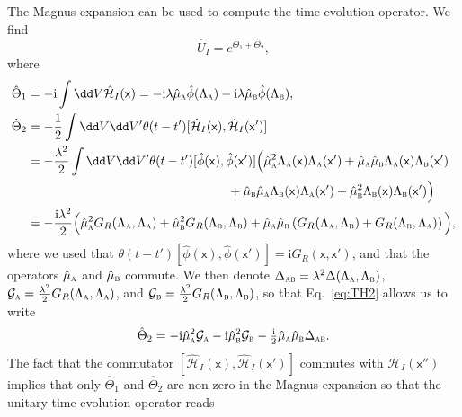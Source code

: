 \documentclass[letterpaper,12pt,titlepage,oneside,final]{book}
\newcommand{\mf}{\mathsf}%
\newcommand{\ii}{\mathrm{i}}
\newcommand{\tc}[1]{\textsc{#1}}
\begin{document}
The Magnus expansion can be used to compute the time evolution operator. We find
\begin{equation}
    \hat{U}_I = e^{\hat{\Theta}_1+\hat{\Theta}_2},
\end{equation}
where
\begin{align}
    \hat{\Theta}_1 &= - \ii \int \dd V \hat{\mathcal{H}}_I(\mf x) = - \ii \lambda \hat{\mu}_\tc{a} \hat{\phi}(\Lambda_\tc{a})- \ii \lambda \hat{\mu}_\tc{b} \hat{\phi}(\Lambda_\tc{b}),\label{eq:TH2}\\
    \hat{\Theta}_2 &= - \frac{1}{2} \int \dd V \dd V' \theta(t-t')[\hat{\mathcal{H}}_I(\mf x), \hat{\mathcal{H}}_I(\mf x')] \\&= - \frac{\lambda^2}{2}\int \dd V \dd V' \theta(t-t')[\hat{\phi}(\mf x), \hat{\phi}(\mf x')]\Big(\hat{\mu}_\tc{a}^2 \Lambda_\tc{a}(\mf x)\Lambda_\tc{a}(\mf x')+\hat{\mu}_\tc{a}\hat{\mu}_\tc{b} \Lambda_\tc{a}(\mf x)\Lambda_\tc{b}(\mf x')\nonumber\\
    &\:\:\:\:\:\:\:\:\:\:\:\:\:\:\:\:\:\:\:\:\:\:\:\:\:\:\:\:\:\:\:\:\:\:\:\:\:\:\:\:\:\:\:\:\:\:\:\:\:\:\:\:\:\:\:\:\:\:\:\:\:\:\:\:\:\:\:\:\:\:\:\:+\hat{\mu}_\tc{b}\hat{\mu}_\tc{a} \Lambda_\tc{b}(\mf x)\Lambda_\tc{a}(\mf x')+\hat{\mu}_\tc{b}^2 \Lambda_\tc{b}(\mf x)\Lambda_\tc{b}(\mf x')\Big)\nonumber\\
    &= - \frac{\ii \lambda^2}{2}\Big(\hat{\mu}_\tc{a}^2 G_R(\Lambda_\tc{a},\Lambda_\tc{a})+\hat{\mu}_\tc{b}^2 G_R(\Lambda_\tc{b},\Lambda_\tc{b})+\hat{\mu}_\tc{a}\hat{\mu}_\tc{b} \left(G_R(\Lambda_\tc{a},\Lambda_\tc{b})+ G_R(\Lambda_\tc{b},\Lambda_\tc{a})\right)\Big),\nonumber
\end{align}
where we used that $\theta(t-t')[\hat{\phi}(\mf x),\hat{\phi}(\mf x')] = \ii G_R(\mf x, \mf x')$, and that the operators $\hat{\mu}_\tc{a}$ and $\hat{\mu}_\tc{b}$ commute. We then denote $\Delta_\tc{ab} = \lambda^2\Delta(\Lambda_\tc{a},\Lambda_\tc{b})$, $\mathcal{G}_\tc{a} = \frac{\lambda^2}{2}G_R(\Lambda_\tc{a},\Lambda_\tc{a})$, and $\mathcal{G}_\tc{b} = \frac{\lambda^2}{2}G_R(\Lambda_\tc{b},\Lambda_\tc{b})$, so that Eq.~\eqref{eq:TH2} allows us to write
\begin{equation}
    \hat{\Theta}_2 = - \ii \hat{\mu}_\tc{a}^2\mathcal{G}_\tc{a}- \ii\hat{\mu}_\tc{b}^2 \mathcal{G}_\tc{b} -  \tfrac{\ii}{2}\hat{\mu}_\tc{a}\hat{\mu}_\tc{b}\Delta_\tc{ab}.
\end{equation}
The fact that the commutator $[\hat{\mathcal{H}}_I(\mf x), \hat{\mathcal{H}}_I(\mf x')]$ commutes with $\mathcal{H}_I(\mf x'')$ implies that only $\hat{\Theta}_1$ and $\hat{\Theta}_2$ are non-zero in the Magnus expansion so that the unitary time evolution operator reads
\end{document}
